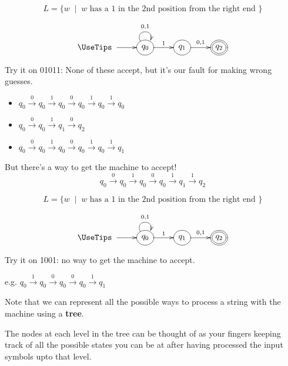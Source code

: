 \documentclass[xcolor=table]{beamer}
\begin{document}
\begin{frame}
  \begin{block}{}
  \[ L = \{ w \; \mid \; w \mbox{ has a 1 in the 2nd position from the
    right end } \} \]
  \end{block}

  \[\UseTips
  \xymatrix {
      *+\txt{\ } \ar[r] & *++[o][F]{q_0} \ar@(ul,ur)^{0,1}
  \ar[r]^{1} & *++[o][F]{q_1} \ar[r]^{0,1} & *++[o][F=]{q_2}
  }
  \]  

  Try it on 01011: None of these accept, but it's our fault for making
  wrong guesses.

  \begin{itemize}
    \item $q_0 \stackrel{0}{\to} q_0 \stackrel{1}{\to} q_0 \stackrel{0}{\to} q_0 \stackrel{1}{\to} q_0 \stackrel{1}{\to} q_0$
    \item $q_0 \stackrel{0}{\to} q_0 \stackrel{1}{\to} q_1 \stackrel{0}{\to} q_2$
    \item $q_0 \stackrel{0}{\to} q_0 \stackrel{1}{\to} q_0 \stackrel{0}{\to} q_0 \stackrel{1}{\to} q_0 \stackrel{1}{\to} q_1$
  \end{itemize}

  \bigskip
  But there's a way to get the machine to accept!
 \[ q_0 \stackrel{0}{\to} q_0 \stackrel{1}{\to} q_0 \stackrel{0}{\to}
 q_0 \stackrel{1}{\to} q_1 \stackrel{1}{\to} q_2 \]

\end{frame}

\begin{frame}
  \begin{block}{}
  \[ L = \{ w \; \mid \; w \mbox{ has a 1 in the 2nd position from the
    right end } \} \]
  \end{block}

  \[\UseTips
  \xymatrix {
      *+\txt{\ } \ar[r] & *++[o][F]{q_0} \ar@(ul,ur)^{0,1}
  \ar[r]^{1} & *++[o][F]{q_1} \ar[r]^{0,1} & *++[o][F=]{q_2}
  }
  \]  

  \bigskip
  Try it on 1001: no way to get the machine to accept.

  e.g. $q_0 \stackrel{1}{\to} q_0 \stackrel{0}{\to} q_0
  \stackrel{0}{\to} q_0 \stackrel{1}{\to} q_1 $

  \bigskip
  Note that we can represent all the possible ways to process a string
  with the machine using a \alert{\textbf{tree}}.

  \bigskip
  The \alert{nodes} at each level in the tree can be thought of as
  your \alert{fingers} keeping track of all the possible states you
  can be at after having processed the input symbols upto that level.
\end{frame}
\end{document}
